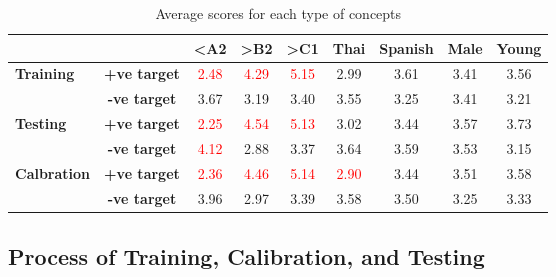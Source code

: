 \begin{table}[H]
    \centering
    \begin{tabular}{|lc|c|c|c|c|c|c|c|}
        \hline
        \multicolumn{2}{|l|}{\textbf{}}                            & \textbf{\textless{}A2} & \textbf{\textgreater{}B2} & \textbf{\textgreater{}C1} & \textbf{Thai}         & \textbf{Spanish}      & \textbf{Male} & \textbf{Young}        \\ \hline
        \multicolumn{1}{|l|}{\multirow{2}{*}{\textbf{Training}}}   & \textbf{+ve target}    & \textcolor{red}{2.48}     & \textcolor{red}{4.29}     & \textcolor{red}{5.15} & 2.99                  & 3.61          & 3.41           & 3.56 \\ \cline{2-9}
        \multicolumn{1}{|l|}{}                                     & \textbf{-ve target}    & 3.67                      & 3.19                      & 3.40                  & 3.55                  & 3.25          & 3.41           & 3.21 \\ \hline
        \multicolumn{1}{|l|}{\multirow{2}{*}{\textbf{Testing}}}    & \textbf{+ve target}    & \textcolor{red}{2.25}     & \textcolor{red}{4.54}     & \textcolor{red}{5.13} & 3.02                  & 3.44          & 3.57           & 3.73 \\ \cline{2-9}
        \multicolumn{1}{|l|}{}                                     & \textbf{-ve target}    & \textcolor{red}{4.12}     & 2.88                      & 3.37                  & 3.64                  & 3.59          & 3.53           & 3.15 \\ \hline
        \multicolumn{1}{|l|}{\multirow{2}{*}{\textbf{Calbration}}} & \textbf{+ve target}    & \textcolor{red}{2.36}     & \textcolor{red}{4.46}     & \textcolor{red}{5.14} & \textcolor{red}{2.90} & 3.44          & 3.51           & 3.58 \\ \cline{2-9}
        \multicolumn{1}{|l|}{}                                     & \textbf{-ve target}    & 3.96                      & 2.97                      & 3.39                  & 3.58                  & 3.50          & 3.25           & 3.33 \\ \hline
    \end{tabular}
    \caption{Average scores for each type of concepts}
    \label{tab:avg_scores}
\end{table}

\subsection{Process of Training, Calibration, and Testing}

